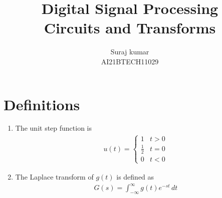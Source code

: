 \documentclass[journal,12pt,twocolumn]{IEEEtran}
\numberwithin{equation}{section}
\renewcommand\thesection{\arabic{section}}
\begin{document}
                             
\title{ Digital Signal Processing \\ Circuits and Transforms}
\author{Suraj kumar\\ \normalsize AI21BTECH11029  }
 \maketitle 
 \tableofcontents
 \section{Definitions}
\begin{enumerate}[label=\arabic*.,ref=\thesection.\theenumi]
\item The unit step function is 
\begin{align}
\label{eq:unit-step}
u(t) =
\begin{cases}
1 & t > 0
\\
	\frac{1}{2} & t = 0
\\
0 & t < 0
\end{cases}
\end{align}
\item The Laplace transform of $g(t)$ is defined as 
\begin{align}
	G(s) = \int_{-\infty}^{\infty} g(t) e^{-st}\, dt
\end{align}
 \end{enumerate}
\end{document}
